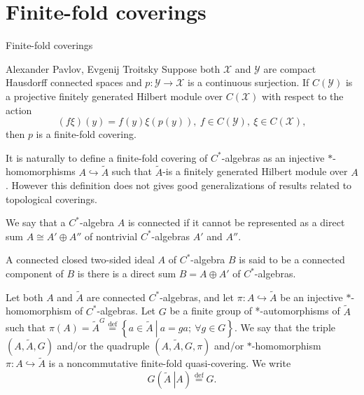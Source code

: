 \documentclass{beamer}
\theoremstyle{plain}
\newcommand{\be}{\begin{equation}}
\newcommand{\ee}{\end{equation}}
\newcommand{\hookto}{\hookrightarrow}        %
\begin{document}
\section{Finite-fold coverings}
\begin{frame}
\huge{Finite-fold coverings} \normalsize	
	\begin{theorem} 	\alert{Alexander Pavlov, Evgenij Troitsky}
		Suppose both $\mathcal X$ and $\mathcal Y$ are compact Hausdorff connected spaces and $p :\mathcal  Y \to \mathcal X$
		is a continuous surjection. If $C(\mathcal Y )$ is a projective finitely generated Hilbert module over
		$C(\mathcal X)$ with respect to the action
		\begin{equation*}
			(f\xi)(y) = f(y)\xi(p(y)), ~ f \in  C(\mathcal Y ), ~ \xi \in  C(\mathcal X),
		\end{equation*}
		then $p$ is a finite-fold  covering.
	\end{theorem}
	It is naturally to define a finite-fold covering of $C^*$-algebras as an injective $*$-homomorphisms $A\hookto \widetilde A$ such that $ \widetilde A$-is a finitely generated Hilbert module over
	$A$. However this definition does not gives good generalizations of results  related to topological coverings.
	
\end{frame}
\begin{frame}
  \begin{definition}\label{connected_c_a_defn}
	We say that a $C^*$-algebra $A$ is \alert{connected} if it cannot be represented as a direct sum  $A \cong A' \oplus A''$ of nontrivial $C^*$-algebras $A'$ and $A''$.
	
\end{definition}
\begin{definition}\label{connected_comp_defn}
	A connected closed two-sided ideal $A$ of  $C^*$-algebra $B$ is said to be a \alert{connected component of}  $B$ is there is a direct sum $B = A \oplus A'$ of $C^*$-algebras.
	\end{definition}
\end{frame}
\begin{frame}
   \begin{definition}\label{fin_quasi_defn}
	Let both  $A$ and  $\widetilde{A}$ are connected $C^*$-algebras, and let $\pi: A \hookto \widetilde{A}$ be an injective $*$-homomorphism of %
	$C^*$-algebras. Let $G$ be a finite  group of *-automorphisms of $\widetilde{A}$ such that 	$\pi\left(A\right) = \widetilde{A}^G\stackrel{\text{def}}{=}\left\{
	\left.a\in \widetilde{A}~\right|~ a = g a;~ \forall g \in G\right\}$.	We say that the triple $\left(A, \widetilde{A}, G \right)$ and/or the quadruple $\left(A, \widetilde{A}, G, \pi \right)$ and/or $*$-homomorphism $\pi: A \hookto \widetilde{A}$   is a \alert{noncommutative finite-fold  quasi-covering}. We write
	\be\label{fin_cov_gr_eqn}
	G\left(\left.\widetilde{A}~\right| {A} \right) \stackrel{\text{def}}{=}  	G.
	\ee
\end{definition}
\end{frame}
\end{document}
